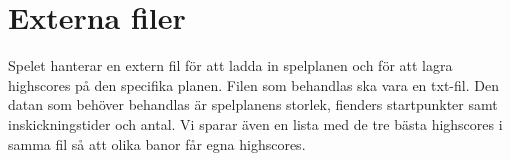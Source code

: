 \documentclass{TDP005mall}
\begin{document}
\section{Externa filer}
Spelet hanterar en extern fil för att ladda in spelplanen och för att lagra highscores på den specifika planen. 
Filen som behandlas ska vara en txt-fil. 
Den datan som behöver behandlas är spelplanens storlek, fienders startpunkter samt inskickningstider och antal. 
Vi sparar även en lista med de tre bästa highscores i samma fil så att olika banor får egna highscores.  
\end{document}
